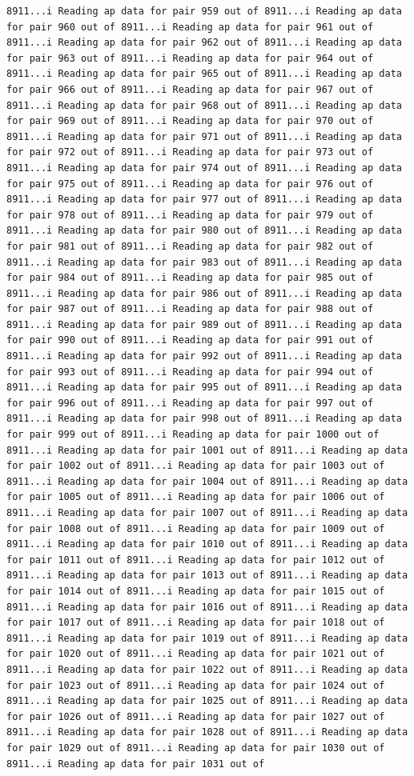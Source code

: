 \documentclass[
]{article}
\begin{document}
\begin{verbatim}
8911...i Reading ap data for pair 959 out of 8911...i Reading ap data for pair 960 out of 8911...i Reading ap data for pair 961 out of 8911...i Reading ap data for pair 962 out of 8911...i Reading ap data for pair 963 out of 8911...i Reading ap data for pair 964 out of 8911...i Reading ap data for pair 965 out of 8911...i Reading ap data for pair 966 out of 8911...i Reading ap data for pair 967 out of 8911...i Reading ap data for pair 968 out of 8911...i Reading ap data for pair 969 out of 8911...i Reading ap data for pair 970 out of 8911...i Reading ap data for pair 971 out of 8911...i Reading ap data for pair 972 out of 8911...i Reading ap data for pair 973 out of 8911...i Reading ap data for pair 974 out of 8911...i Reading ap data for pair 975 out of 8911...i Reading ap data for pair 976 out of 8911...i Reading ap data for pair 977 out of 8911...i Reading ap data for pair 978 out of 8911...i Reading ap data for pair 979 out of 8911...i Reading ap data for pair 980 out of 8911...i Reading ap data for pair 981 out of 8911...i Reading ap data for pair 982 out of 8911...i Reading ap data for pair 983 out of 8911...i Reading ap data for pair 984 out of 8911...i Reading ap data for pair 985 out of 8911...i Reading ap data for pair 986 out of 8911...i Reading ap data for pair 987 out of 8911...i Reading ap data for pair 988 out of 8911...i Reading ap data for pair 989 out of 8911...i Reading ap data for pair 990 out of 8911...i Reading ap data for pair 991 out of 8911...i Reading ap data for pair 992 out of 8911...i Reading ap data for pair 993 out of 8911...i Reading ap data for pair 994 out of 8911...i Reading ap data for pair 995 out of 8911...i Reading ap data for pair 996 out of 8911...i Reading ap data for pair 997 out of 8911...i Reading ap data for pair 998 out of 8911...i Reading ap data for pair 999 out of 8911...i Reading ap data for pair 1000 out of 8911...i Reading ap data for pair 1001 out of 8911...i Reading ap data for pair 1002 out of 8911...i Reading ap data for pair 1003 out of 8911...i Reading ap data for pair 1004 out of 8911...i Reading ap data for pair 1005 out of 8911...i Reading ap data for pair 1006 out of 8911...i Reading ap data for pair 1007 out of 8911...i Reading ap data for pair 1008 out of 8911...i Reading ap data for pair 1009 out of 8911...i Reading ap data for pair 1010 out of 8911...i Reading ap data for pair 1011 out of 8911...i Reading ap data for pair 1012 out of 8911...i Reading ap data for pair 1013 out of 8911...i Reading ap data for pair 1014 out of 8911...i Reading ap data for pair 1015 out of 8911...i Reading ap data for pair 1016 out of 8911...i Reading ap data for pair 1017 out of 8911...i Reading ap data for pair 1018 out of 8911...i Reading ap data for pair 1019 out of 8911...i Reading ap data for pair 1020 out of 8911...i Reading ap data for pair 1021 out of 8911...i Reading ap data for pair 1022 out of 8911...i Reading ap data for pair 1023 out of 8911...i Reading ap data for pair 1024 out of 8911...i Reading ap data for pair 1025 out of 8911...i Reading ap data for pair 1026 out of 8911...i Reading ap data for pair 1027 out of 8911...i Reading ap data for pair 1028 out of 8911...i Reading ap data for pair 1029 out of 8911...i Reading ap data for pair 1030 out of 8911...i Reading ap data for pair 1031 out of 
\end{verbatim}
\end{document}
